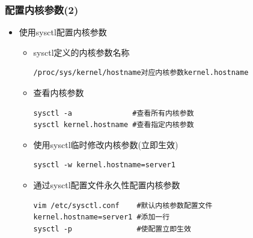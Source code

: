 \documentclass[xcolor=svgnames,presentation]{beamer}
\begin{document}
\begin{frame}[fragile]
\frametitle{配置内核参数(2)}
\label{sec-2-8}
\begin{itemize}

\item 使用sysctl配置内核参数
\label{sec-2-8-1}%
\begin{itemize}

\item sysctl定义的内核参数名称\\
\label{sec-2-8-1-1}%
\begin{verbatim}
/proc/sys/kernel/hostname对应内核参数kernel.hostname
\end{verbatim}

\item 查看内核参数\\
\label{sec-2-8-1-2}%
\begin{verbatim}
sysctl -a              #查看所有内核参数
sysctl kernel.hostname #查看指定内核参数
\end{verbatim}

\item 使用sysctl临时修改内核参数(立即生效)\\
\label{sec-2-8-1-3}%
\begin{verbatim}
sysctl -w kernel.hostname=server1
\end{verbatim}

\item 通过sysctl配置文件永久性配置内核参数\\
\label{sec-2-8-1-4}%
\begin{verbatim}
vim /etc/sysctl.conf    #默认内核参数配置文件
kernel.hostname=server1 #添加一行
sysctl -p               #使配置立即生效
\end{verbatim}
\end{itemize} %
\end{itemize} %
\end{frame}
\end{document}
